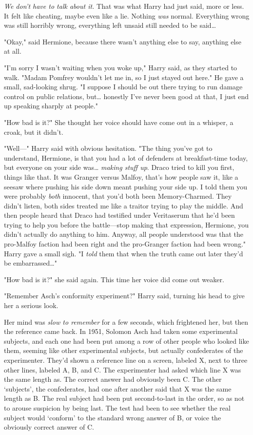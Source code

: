 \emph{We don't have to talk about it.} That was what Harry had just said, more
or less. It felt like cheating, maybe even like a lie. Nothing \emph{was}
normal. Everything wrong was still horribly wrong, everything left unsaid still
needed to be said{\ldots}

"Okay," said Hermione, because there wasn't anything else to say, anything else
at all.

"I'm sorry I wasn't waiting when you woke up," Harry said, as they started to
walk. "Madam Pomfrey wouldn't let me in, so I just stayed out here." He gave a
small, sad-looking shrug. "I suppose I should be out there trying to run damage
control on public relations, but{\ldots} honestly I've never been good at that,
I just end up speaking sharply at people."

"How bad is it?" She thought her voice should have come out in a whisper, a
croak, but it didn't.

"Well---" Harry said with obvious hesitation. "The thing you've got to
understand, Hermione, is that you had a lot of defenders at breakfast-time
today, but everyone on your side was{\ldots} \emph{making stuff up}. Draco
tried to kill you first, things like that. It was Granger versus Malfoy, that's
how people saw it, like a seesaw where pushing his side down meant pushing your
side up. I told them you were probably \emph{both} innocent, that you'd both
been Memory-Charmed. They didn't listen, both sides treated me like a traitor
trying to play the middle. And then people heard that Draco had testified under
Veritaserum that he'd been trying to help you before the battle---stop making
that expression, Hermione, you didn't actually do anything to him. Anyway, all
people understood was that the pro-Malfoy faction had been right and the
pro-Granger faction had been wrong." Harry gave a small sigh. "I \emph{told}
them that when the truth came out later they'd be embarrassed{\ldots}"

"How bad is it?" she said again. This time her voice did come out weaker.

"Remember Asch's conformity experiment?" Harry said, turning his head to give
her a serious look.

Her mind was \emph{slow to remember} for a few seconds, which frightened her,
but then the reference came back. In 1951, Solomon Asch had taken some
experimental subjects, and each one had been put among a row of other people
who looked like them, seeming like other experimental subjects, but actually
confederates of the experimenter. They'd shown a reference line on a screen,
labeled X, next to three other lines, labeled A, B, and C\@. The experimenter had
asked which line X was the same length as. The correct answer had obviously
been C\@. The other `subjects', the confederates, had one after another said that
X was the same length as B\@. The real subject had been put second-to-last in the
order, so as not to arouse suspicion by being last. The test had been to see
whether the real subject would `conform' to the standard wrong answer of B, or
voice the obviously correct answer of C\@.

